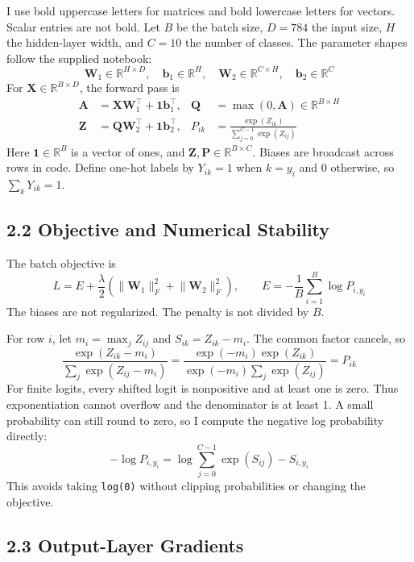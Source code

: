 \documentclass[a4paper,12pt]{article}
\begin{document}
I use bold uppercase letters for matrices and bold lowercase letters for vectors. Scalar entries are not bold. Let \(B\) be the batch size, \(D=784\) the input size, \(H\) the hidden-layer width, and \(C=10\) the number of classes. The parameter shapes follow the supplied notebook: \[
\boldsymbol{W}_1\in\mathbb{R}^{H\times D},\quad
\boldsymbol{b}_1\in\mathbb{R}^{H},\quad
\boldsymbol{W}_2\in\mathbb{R}^{C\times H},\quad
\boldsymbol{b}_2\in\mathbb{R}^{C}
\] For \(\boldsymbol{X}\in\mathbb{R}^{B\times D}\), the forward pass is \[
\begin{aligned}
\boldsymbol{A}&=\boldsymbol{X}\boldsymbol{W}_1^\top+\boldsymbol{1}\boldsymbol{b}_1^\top,
&\boldsymbol{Q}&=\max(0,\boldsymbol{A})\in\mathbb{R}^{B\times H}\\
\boldsymbol{Z}&=\boldsymbol{Q}\boldsymbol{W}_2^\top+\boldsymbol{1}\boldsymbol{b}_2^\top,
&P_{ik}&=\frac{\exp(Z_{ik})}{\sum_{j=0}^{C-1}\exp(Z_{ij})}
\end{aligned}
\] Here \(\boldsymbol{1}\in\mathbb{R}^{B}\) is a vector of ones, and \(\boldsymbol{Z},\boldsymbol{P}\in\mathbb{R}^{B\times C}\). Biases are broadcast across rows in code. Define one-hot labels by \(Y_{ik}=1\) when \(k=y_i\) and 0 otherwise, so \(\sum_kY_{ik}=1\).

\subsection*{2.2 Objective and Numerical Stability}

The batch objective is \[
L=E+\frac{\lambda}{2}\left(\lVert\boldsymbol{W}_1\rVert_F^2+
\lVert\boldsymbol{W}_2\rVert_F^2\right),\qquad
E=-\frac{1}{B}\sum_{i=1}^{B}\log P_{i,y_i}
\] The biases are not regularized. The penalty is not divided by \(B\).

For row \(i\), let \(m_i=\max_jZ_{ij}\) and \(S_{ik}=Z_{ik}-m_i\). The common factor cancels, so \[
\frac{\exp(Z_{ik}-m_i)}{\sum_j\exp(Z_{ij}-m_i)}
=\frac{\exp(-m_i)\exp(Z_{ik})}{\exp(-m_i)\sum_j\exp(Z_{ij})}
=P_{ik}
\] For finite logits, every shifted logit is nonpositive and at least one is zero. Thus exponentiation cannot overflow and the denominator is at least 1. A small probability can still round to zero, so I compute the negative log probability directly: \[
-\log P_{i,y_i}=\log\sum_{j=0}^{C-1}\exp(S_{ij})-S_{i,y_i}
\] This avoids taking \texttt{log(0)} without clipping probabilities or changing the objective.

\subsection*{2.3 Output-Layer Gradients}
\end{document}
